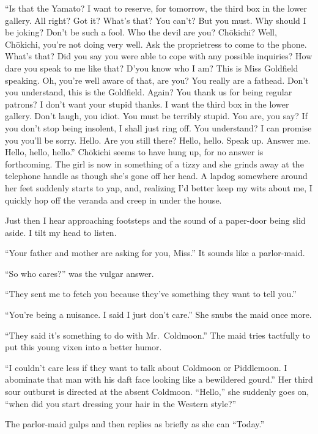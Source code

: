 \documentclass[12pt, openright]{book}
\begin{document}
``Is that the Yamato? I want to reserve, for tomorrow, the third box in
the lower gallery. All right? Got it? What's that? You can't? But you
must. Why should I be joking? Don't be such a fool. Who the devil are
you? Chōkichi? Well, Chōkichi, you're not doing very well. Ask the
proprietress to come to the phone. What's that? Did you say you were
able to cope with any possible inquiries? How dare you speak to me like
that? D'you know who I am? This is Miss Goldfield speaking. Oh, you're
well aware of that, are you? You really are a fathead. Don't you
understand, this is the Goldfield. Again? You thank us for being regular
patrons? I don't want your stupid thanks. I want the third box in the
lower gallery. Don't laugh, you idiot. You must be terribly stupid. You
are, you say? If you don't stop being insolent, I shall just ring off.
You understand? I can promise you you'll be sorry. Hello. Are you still
there? Hello, hello. Speak up. Answer me. Hello, hello, hello.''
Chōkichi seems to have hung up, for no answer is forthcoming. The girl
is now in something of a tizzy and she grinds away at the telephone
handle as though she's gone off her head. A lapdog somewhere around her
feet suddenly starts to yap, and, realizing I'd better keep my wits
about me, I quickly hop off the veranda and creep in under the house.

Just then I hear approaching footsteps and the sound of a paper-door
being slid aside. I tilt my head to listen.

``Your father and mother are asking for you, Miss.'' It sounds like a
parlor-maid.

``So who cares?'' was the vulgar answer.

``They sent me to fetch you because they've something they want to tell
you.''

``You're being a nuisance. I said I just don't care.'' She snubs the
maid once more.

``They said it's something to do with Mr.~Coldmoon.'' The maid tries
tactfully to put this young vixen into a better humor.

``I couldn't care less if they want to talk about Coldmoon or
Piddlemoon. I abominate that man with his daft face looking like a
bewildered gourd.'' Her third sour outburst is directed at the absent
Coldmoon. ``Hello,'' she suddenly goes on, ``when did you start dressing
your hair in the Western style?''

The parlor-maid gulps and then replies as briefly as she can ``Today.''
\end{document}
